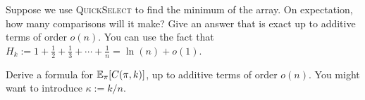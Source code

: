 \documentclass[11pt,a4paper,oneside]{article}
\newcommand{\E}{\mathop{\mathbb{E\/}}}
\begin{document}
\begin{problem}{8}
\statement
Suppose we use \textsc{QuickSelect} to find the minimum of the array. On expectation,
how many comparisons will it make? Give an answer that is exact up to additive terms 
of order $o(n)$.
You can use the fact that $H_k := 1 + \frac{1}{2} + \frac{1}{3} + \cdots  + \frac{1}{n} = \ln(n) + o(1)$.
\end{problem}

\begin{problem}{9}
\statement
Derive a formula for $\E_{\pi} [C(\pi,k)]$, up to additive terms of order $o(n)$.
You might want to introduce $\kappa := k/n$.
\end{problem}
\end{document}
